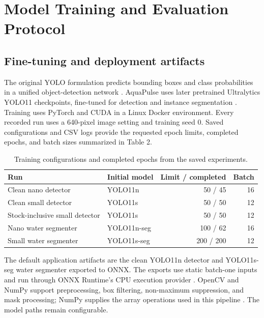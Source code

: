 \documentclass[a4paper,11pt]{article}
\begin{document}
\section{Model Training and Evaluation Protocol}

\subsection{Fine-tuning and deployment artifacts}

The original YOLO formulation predicts bounding boxes and class probabilities in a unified object-detection network \cite{ref10}. AquaPulse uses later pretrained Ultralytics YOLO11 checkpoints, fine-tuned for detection and instance segmentation \cite{ref3}. Training uses PyTorch \cite{ref11} and CUDA in a Linux Docker environment. Every recorded run uses a 640-pixel image setting and training seed 0. Saved configurations and CSV logs provide the requested epoch limits, completed epochs, and batch sizes summarized in Table 2.

\begin{table}[!htbp]
\centering
\caption{Training configurations and completed epochs from the saved experiments.}
\label{tab:2}
\fontsize{9.5}{11.5}\selectfont
\setlength{\tabcolsep}{4.3pt}
\renewcommand{\arraystretch}{1.18}
\begin{tabularx}{\linewidth}{@{}>{\raggedright\arraybackslash}Xlrr@{}}
\toprule
\textbf{Run} & \textbf{Initial model} & \textbf{Limit / completed} & \textbf{Batch} \\
\midrule
Clean nano detector & YOLO11n & 50 / 45 & 16 \\
Clean small detector & YOLO11s & 50 / 50 & 12 \\
Stock-inclusive small detector & YOLO11s & 50 / 50 & 12 \\
Nano water segmenter & YOLO11n-seg & 100 / 62 & 16 \\
Small water segmenter & YOLO11s-seg & 200 / 200 & 12 \\
\bottomrule
\end{tabularx}
\end{table}

The default application artifacts are the clean YOLO11n detector and YOLO11s-seg water segmenter exported to ONNX. The exports use static batch-one inputs and run through ONNX Runtime's CPU execution provider \cite{ref4}. OpenCV and NumPy support preprocessing, box filtering, non-maximum suppression, and mask processing; NumPy supplies the array operations used in this pipeline \cite{ref12}. The model paths remain configurable.
\end{document}
